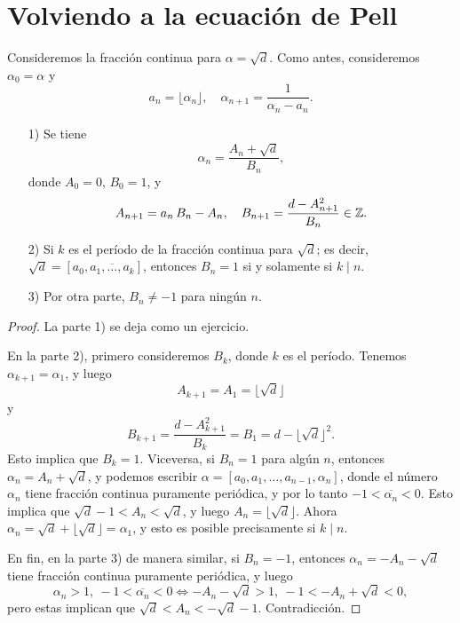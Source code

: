 
\section{Volviendo a la ecuación de Pell}

\begin{lema}
  Consideremos la fracción continua para $\alpha = \sqrt{d}$. Como antes,
  consideremos $\alpha_0 = \alpha$ y
  \[ a_n = \lfloor\alpha_n\rfloor, \quad
     \alpha_{n+1} = \frac{1}{\alpha_n - a_n}. \]

  \begin{enumerate}
  \item[1)] Se tiene
    $$\alpha_n = \frac{A_n + \sqrt{d}}{B_n},$$
    donde $A_0 = 0$, $B_0 = 1$, y
    \[ A_{n+1} = a_n\,B_n - A_n, \quad
       B_{n+1} = \frac{d - A_{n+1}^2}{B_n} \in \mathbb{Z}. \]

  \item[2)] Si $k$ es el período de la fracción continua para $\sqrt{d}$;
    es decir, $\sqrt{d} = [a_0, \overline{a_1,\ldots,a_k}]$, entonces
    $B_n = 1$ si y solamente si $k \mid n$.

  \item[3)] Por otra parte, $B_n \ne -1$ para ningún $n$.
  \end{enumerate}

  \begin{proof}
    La parte 1) se deja como un ejercicio.

    En la parte 2), primero consideremos $B_k$, donde $k$ es el período.
    Tenemos $\alpha_{k+1} = \alpha_1$, y luego
    $$A_{k+1} = A_1 = \lfloor\sqrt{d}\rfloor$$
    y
    $$B_{k+1} = \frac{d - A_{k+1}^2}{B_k} = B_1 = d - \lfloor\sqrt{d}\rfloor^2.$$
    Esto implica que $B_k = 1$. Viceversa, si $B_n = 1$ para algún $n$, entonces
    $\alpha_n = A_n + \sqrt{d}$, y podemos escribir
    ${\alpha = [a_0,a_1,\ldots,a_{n-1},\alpha_n]}$, donde el número $\alpha_n$
    tiene fracción continua puramente periódica, y por lo tanto
    ${-1 < \overline{\alpha_n} < 0}$. Esto implica que
    ${\sqrt{d} - 1 < A_n < \sqrt{d}}$, y luego $A_n = \lfloor\sqrt{d}\rfloor$.
    Ahora ${\alpha_n = \sqrt{d} + \lfloor\sqrt{d}\rfloor = \alpha_1}$, y esto es
    posible precisamente si $k \mid n$.

    En fin, en la parte 3) de manera similar, si $B_n = -1$, entonces
    ${\alpha_n = -A_n - \sqrt{d}}$ tiene fracción continua puramente periódica,
    y luego
    \[ \alpha_n > 1, ~ -1 < \overline{\alpha_n} < 0
       \iff
       -A_n - \sqrt{d} > 1, ~ -1 < -A_n + \sqrt{d} < 0, \]
    pero estas implican que ${\sqrt{d} < A_n < -\sqrt{d} - 1}$. Contradicción.
  \end{proof}
\end{lema}

